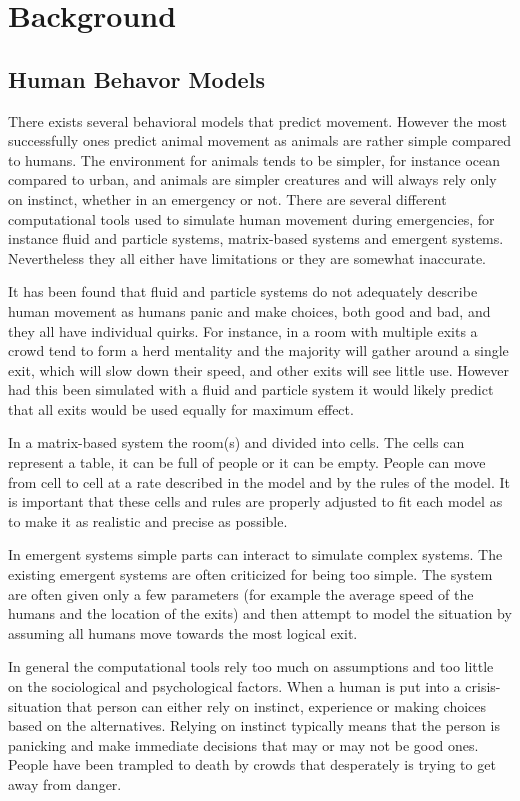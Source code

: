 \chapter{Background}
\label{ch:background}

\section{Human Behavor Models}
There exists several behavioral models that predict movement. However the most successfully ones predict 
animal movement as animals are rather simple compared to humans. The environment for animals tends to 
be simpler, for instance ocean compared to urban, and animals are simpler creatures and will always rely only 
on instinct, whether in an emergency or not. There are several different computational tools used to simulate  
human movement during emergencies, for instance fluid and particle systems, matrix-based systems and  
emergent systems. Nevertheless they all either have limitations or they are somewhat inaccurate. 
 
It has been found that fluid and particle systems do not adequately describe human movement as humans  
panic and make choices, both good and bad, and they all have individual quirks. For instance, in a room with  
multiple exits a crowd tend to form a herd mentality and the majority will gather around a single exit, which  
will slow down their speed, and other exits will see little use. However had this been simulated with a fluid  
and particle system it would likely predict that all exits would be used equally for maximum effect. 
 
In a matrix-based system the room(s) and divided into cells. The cells can represent a table, it can be full of  
people or it can be empty. People can move from cell to cell at a rate described in the model and by the  
rules of the model. It is important that these cells and rules are properly adjusted to fit each model as to  
make it as realistic and precise as possible. 
 
In emergent systems simple parts can interact to simulate complex systems. The existing emergent systems  
are often criticized for being too simple. The system are often given only a few parameters (for example the  
average speed of the humans and the location of the exits) and then attempt to model the situation by  
assuming all humans move towards the most logical exit. 
 
In general the computational tools rely too much on assumptions and too little on the sociological and psychological  
factors. When a human is put into a crisis-situation that person can either rely on instinct, experience or making  
choices based on the alternatives. Relying on instinct typically means that the person is panicking and make immediate  
decisions that may or may not be good ones. People have been trampled to death by crowds that desperately is trying  
to get away from danger. 
 
